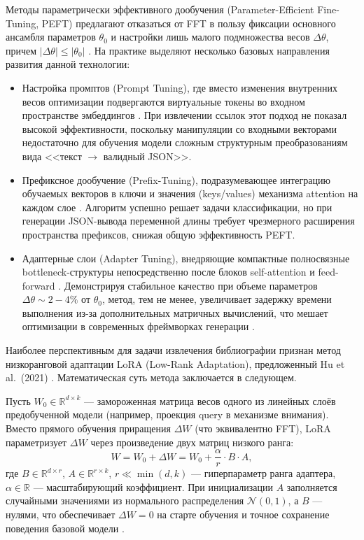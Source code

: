 Методы параметрически эффективного дообучения (Parameter-Efficient Fine-Tuning, PEFT) предлагают отказаться от FFT в пользу фиксации основного ансамбля параметров $\theta_0$ и настройки лишь малого подмножества весов $\Delta\theta$, причем $|\Delta\theta|\leq |\theta_0|$ \cite{liu2023parameter}. На практике выделяют несколько базовых направления развития данной технологии:
\begin{itemize}
\item Настройка промптов (Prompt Tuning), где вместо изменения внутренних весов оптимизации подвергаются виртуальные токены во входном пространстве эмбеддингов \cite{lester2021power}. При извлечении ссылок этот подход не показал высокой эффективности, поскольку манипуляции со входными векторами недостаточно для обучения модели сложным структурным преобразованиям вида <<текст  $\rightarrow$ валидный JSON>>.
\item Префиксное дообучение (Prefix-Tuning), подразумевающее интеграцию обучаемых векторов в ключи и значения (keys/values) механизма attention на каждом слое \cite{li2021prefix}. Алгоритм успешно решает задачи классификации, но при генерации JSON-вывода переменной длины требует чрезмерного расширения пространства префиксов, снижая общую эффективность PEFT.
\item Адаптерные слои (Adapter Tuning), внедряющие компактные полносвязные bottleneck-структуры непосредственно после блоков self-attention и feed-forward \cite{houlsby2019parameter}\cite{pfeiffer2020adapterhub}. Демонстрируя стабильное качество при объеме параметров $\Delta\theta\sim2-4\%$ от $\theta_0$, метод, тем не менее, увеличивает задержку времени выполнения из-за дополнительных матричных вычислений, что мешает оптимизации в современных фреймворках генерации \cite{liu2023parameter}.
\end{itemize} 

Наиболее перспективным для задачи извлечения библиографии признан метод низкоранговой адаптации LoRA (Low-Rank Adaptation), предложенный Hu et al.~(2021) \cite{hu2022lora}. Математическая суть метода заключается в следующем.

Пусть $W_0 \in \mathbb{R}^{d \times k}$ --- замороженная матрица весов одного из линейных слоёв предобученной модели (например, проекция query в механизме внимания). Вместо прямого обучения приращения $\Delta W$ (что эквивалентно FFT), LoRA параметризует $\Delta W$ через произведение двух матриц низкого ранга:
\begin{equation}
W = W_0 + \Delta W = W_0 + \frac{\alpha}{r} \cdot B \cdot A,
\end{equation}
где $B \in \mathbb{R}^{d \times r}$, $A \in \mathbb{R}^{r \times k}$, $r \ll \min(d, k)$ --- гиперпараметр ранга адаптера, $\alpha \in \mathbb{R}$ --- масштабирующий коэффициент. При инициализации $A$ заполняется случайными значениями из нормального распределения $\mathcal{N}(0, 1)$, а $B$ --- нулями, что обеспечивает $\Delta W = 0$ на старте обучения и точное сохранение поведения базовой модели \cite{hu2022lora}.

